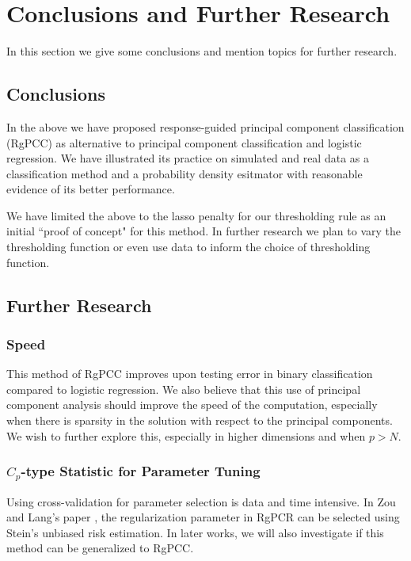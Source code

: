 \documentclass[main.tex]{subfiles}
\begin{document}
\section{Conclusions and Further Research}

In this section we give some conclusions and mention topics for further research.

\subsection{Conclusions}

In the above we have proposed response-guided principal component classification (RgPCC) as alternative to principal component classification and logistic regression. We have illustrated its practice on simulated and real data as a classification method and a probability density esitmator with reasonable evidence of its better performance.

We have limited the above to the lasso penalty for our thresholding rule as an initial ``proof of concept" for this method. In further research we plan to vary the thresholding function or even use data to inform the choice of thresholding function.

\subsection{Further Research}
\subsubsection{Speed}
This method of RgPCC improves upon testing error in binary classification compared to logistic regression. We also believe that this use of principal component analysis should improve the speed of the computation, especially when there is sparsity in the solution with respect to the principal components. We wish to further explore this, especially in higher dimensions and when $p > N$.

\subsubsection{$C_p$-type Statistic for Parameter Tuning}
Using cross-validation for parameter selection is data and time intensive. In Zou and Lang's paper \cite{langzou}, the regularization parameter in RgPCR can be selected using Stein's unbiased risk estimation. In later works, we will also investigate if this method can be generalized to RgPCC.
\end{document}
